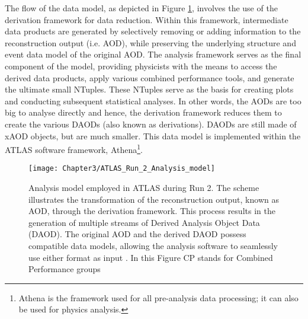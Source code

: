 The flow of the data model, as depicted in Figure \ref{fig:Chap3:Analysis_data_model_ATLAS}, 
involves the use of the derivation framework for data reduction. Within this framework, intermediate 
data products are generated by selectively removing or adding information to the reconstruction output 
(i.e. AOD), while preserving the underlying structure and event data model of the original AOD. 
The analysis framework serves as the final component of the model, providing physicists with 
the means to access the derived data products, apply various combined performance tools, and 
generate the ultimate small NTuples. These NTuples serve as the basis for creating plots and 
conducting subsequent statistical analyses. In other words,  the AODs are too big to analyse directly 
and hence, the derivation framework reduces them to create the various DAODs (also known as derivations). 
DAODs are still made of xAOD objects, but are much smaller. 
This data model is implemented within
the  ATLAS software framework, Athena\footnote{Athena is the framework used for all pre-analysis data processing; it can also be
used for physics analysis.}.


\begin{figure}
 	 \centering
 	  \texttt{[image: Chapter3/ATLAS\_Run\_2\_Analysis\_model]}
	  \caption{Analysis model employed in ATLAS during Run 2. The scheme illustrates the transformation 
	  of the reconstruction output, known as AOD, through the derivation framework. This process results in 
	  the generation of multiple streams of Derived Analysis Object Data (DAOD). The original AOD and the 
	  derived DAOD possess compatible data models, allowing the analysis software to seamlessly use 
	  either format as input \cite{Brun:1997pa}. In this Figure CP stands for Combined Performance groups}
	\label{fig:Chap3:Analysis_data_model_ATLAS}
\end{figure}



%
%
